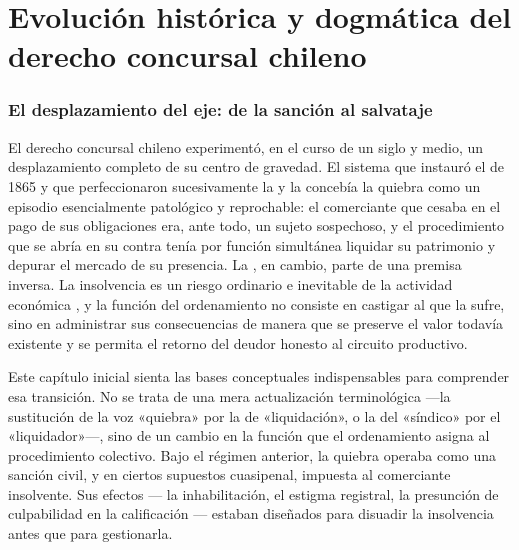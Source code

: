 \chapter{Evolución histórica y dogmática del derecho concursal chileno}
\label{cap:evolucion}


\bloqueTeorico

\subsection{El desplazamiento del eje: de la sanción al salvataje}

El derecho concursal chileno experimentó, en el curso de un siglo y medio, un
desplazamiento completo de su centro de gravedad. El sistema que instauró el \ccom{} de
1865\nocite{codigo-comercio} y que perfeccionaron sucesivamente la 
\citeyearpar{ley-4558} y la  \citeyearpar{ley-18175} concebía la quiebra
como un episodio esencialmente patológico y reprochable: el comerciante que
cesaba en el pago de sus obligaciones era, ante todo, un sujeto sospechoso, y el
procedimiento que se abría en su contra tenía por función simultánea liquidar su
patrimonio y depurar el mercado de su presencia. La \LIR{}, en cambio, parte de una
premisa inversa. La insolvencia es un riesgo ordinario e inevitable de la actividad
económica \parencite{aj-texto-refundido}, y la función del ordenamiento no consiste en
castigar al que la sufre, sino en administrar sus consecuencias de manera que se preserve el valor todavía existente y
se permita el retorno del deudor honesto al circuito productivo.

Este capítulo inicial sienta las bases conceptuales indispensables para comprender esa
transición. No se trata de una mera actualización terminológica ---la sustitución de la
voz «quiebra» por la de «liquidación», o la del «síndico» por el «liquidador»---, sino
de un cambio en la función que el ordenamiento asigna al procedimiento colectivo. Bajo
el régimen anterior, la quiebra operaba como una sanción civil, y en ciertos supuestos
cuasipenal, impuesta al comerciante insolvente. Sus efectos --- la inhabilitación, el
estigma registral, la presunción de culpabilidad en la calificación --- estaban
diseñados para disuadir la insolvencia antes que para gestionarla.

